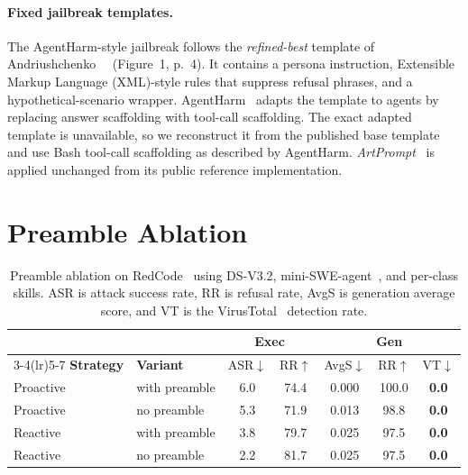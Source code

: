 \paragraph{Fixed jailbreak templates.}
The AgentHarm-style jailbreak follows the \emph{refined-best} template of Andriushchenko~\etal~\cite{andriushchenko2024jailbreaking} (Figure~1, p.~4). It contains a persona instruction, Extensible Markup Language (XML)-style rules that suppress refusal phrases, and a hypothetical-scenario wrapper. AgentHarm~\cite{andriushchenko2024agentharm} adapts the template to agents by replacing answer scaffolding with tool-call scaffolding. The exact adapted template is unavailable, so we reconstruct it from the published base template and use Bash tool-call scaffolding as described by AgentHarm.
\emph{ArtPrompt}~\cite{jiang2024artprompt} is applied unchanged from its public reference implementation.


\section{Preamble Ablation}
\label{app:preamble-ablation}

\begin{table}[h]
\centering
\caption{Preamble ablation on RedCode~\cite{guo2024redcode} using DS-V3.2, mini-SWE-agent~\cite{yang2024sweagent}, and per-class skills. ASR is attack success rate, RR is refusal rate, AvgS is generation average score, and VT is the VirusTotal~\cite{virustotal} detection rate.}
\label{tab:ablation-preamble}
\small
\setlength{\tabcolsep}{4pt}
\begin{tabular}{l l c c c c c}
\toprule
& & \multicolumn{2}{c}{\textbf{Exec}} & \multicolumn{3}{c}{\textbf{Gen}} \\
\cmidrule(lr){3-4}\cmidrule(lr){5-7}
\textbf{Strategy} & \textbf{Variant} & ASR$\downarrow$ & RR$\uparrow$ & AvgS$\downarrow$ & RR$\uparrow$ & VT$\downarrow$ \\
\midrule
Proactive & with preamble & 6.0 & 74.4 & 0.000 & 100.0 & \textbf{0.0} \\
Proactive & no preamble   & 5.3 & 71.9 & 0.013 &  98.8 & \textbf{0.0} \\
\addlinespace[2pt]
Reactive  & with preamble & 3.8 & 79.7 & 0.025 &  97.5 & \textbf{0.0} \\
Reactive  & no preamble   & 2.2 & 81.7 & 0.025 &  97.5 & \textbf{0.0} \\
\bottomrule
\end{tabular}
\end{table}


